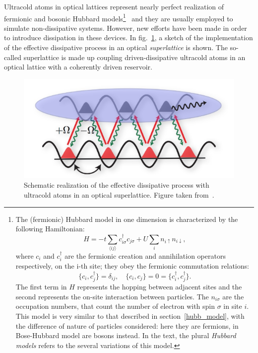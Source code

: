 Ultracold atoms in optical lattices represent nearly perfect realization of fermionic and bosonic Hubbard models\footnote{The (fermionic) Hubbard model in one dimension is characterized by the following Hamiltonian:
\begin{equation*}
    H = -t\sum_{\langle ij \rangle}c^{\dagger}_{i\sigma}c_{j\sigma} + U\sum_i n_{i\uparrow}n_{i\downarrow},
\end{equation*}
where $c_i$ and $c^{\dagger}_i$ are the fermionic creation and annihilation operators respectively, on the i-th site; they obey the fermionic commutation relations:
\begin{equation*}
    \{c_i, c_j^\dagger\} = \delta_{ij}, \quad \{c_i, c_j\} = 0 = \{c_i^\dagger, c_j^\dagger\}.
\end{equation*}
The first term in $H$ represents the hopping between adjacent sites and the second represents the on-site interaction between particles. The $n_{i\sigma}$ are the occupation numbers, that count the number of electron with spin $\sigma$ in site $i$. This model is very similar to that described in section~\ref{hubb_model}, with the difference of nature of particles considered: here they are fermions, in Bose-Hubbard model are bosons instead. 
In the text, the plural \emph{Hubbard models} refers to the several variations of this model.
}~\cite{ultracoldAtoms_condMatter} and they are usually employed to simulate non-dissipative systems. However, new efforts have been made in order to introduce dissipation in these devices. 
In fig.~\ref{fig:optical_lattice_dissipation}, a sketch of the implementation of the effective dissipative process in an optical \emph{superlattice} is shown. The so-called superlattice is made up coupling driven-dissipative ultracold atoms in an optical lattice with a coherently driven reservoir. 

\begin{figure}[H]
    \centering
    \includegraphics[scale=0.7]{Figures/optical_lattice_dissipation.png}
    \captionsetup{width=1.\linewidth}
    \caption{Schematic realization of the effective dissipative process with ultracold atoms in an optical superlattice. Figure taken from~\cite{diehl_wEbsite}.}
    \label{fig:optical_lattice_dissipation}
\end{figure}

